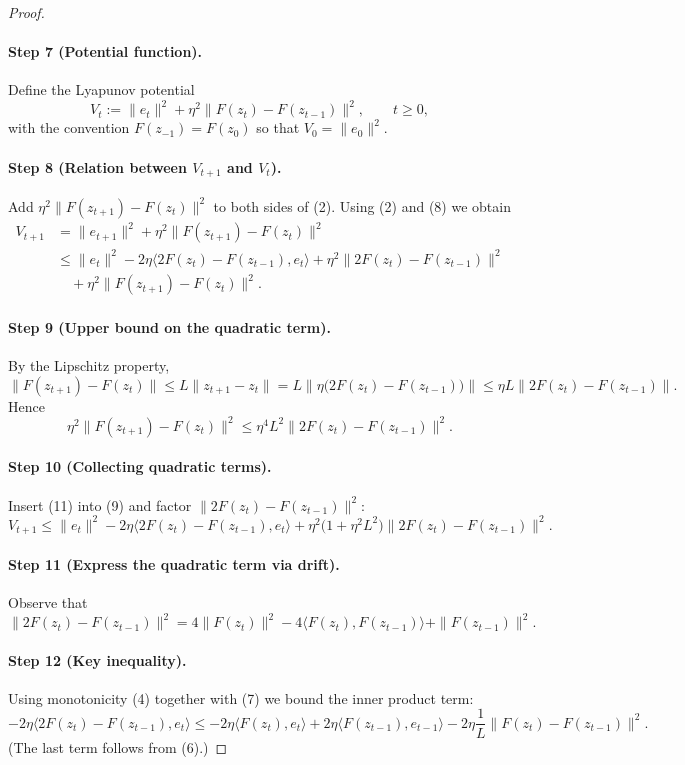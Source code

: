 \documentclass{article}
\begin{document}
\begin{proof}
\paragraph{Step 7 (Potential function).}
Define the Lyapunov potential
\[
V_t:=\|e_t\|^2+\eta^2\|F(z_t)-F(z_{t-1})\|^2,\qquad t\ge0,
\tag{8}
\]
with the convention $F(z_{-1})=F(z_0)$ so that $V_0=\|e_0\|^2$.

\paragraph{Step 8 (Relation between $V_{t+1}$ and $V_t$).}
Add $\eta^2\|F(z_{t+1})-F(z_t)\|^2$ to both sides of (2). Using (2) and (8) we obtain
\[
\begin{aligned}
V_{t+1}
&= \|e_{t+1}\|^2+\eta^2\|F(z_{t+1})-F(z_t)\|^2\\
&\le \|e_t\|^2
-2\eta\bigl\langle 2F(z_t)-F(z_{t-1}),e_t\bigr\rangle
+\eta^2\|2F(z_t)-F(z_{t-1})\|^2\\
&\quad+\eta^2\|F(z_{t+1})-F(z_t)\|^2 .
\end{aligned}
\tag{9}
\]

\paragraph{Step 9 (Upper bound on the quadratic term).}
By the Lipschitz property,
\[
\|F(z_{t+1})-F(z_t)\|\le L\|z_{t+1}-z_t\|
= L\bigl\|\eta\bigl(2F(z_t)-F(z_{t-1})\bigr)\bigr\|
\le \eta L\bigl\|2F(z_t)-F(z_{t-1})\bigr\|.
\tag{10}
\]
Hence
\[
\eta^2\|F(z_{t+1})-F(z_t)\|^2\le \eta^4L^2\|2F(z_t)-F(z_{t-1})\|^2 .
\tag{11}
\]

\paragraph{Step 10 (Collecting quadratic terms).}
Insert (11) into (9) and factor $\|2F(z_t)-F(z_{t-1})\|^2$:
\[
V_{t+1}\le \|e_t\|^2
-2\eta\bigl\langle 2F(z_t)-F(z_{t-1}),e_t\bigr\rangle
+\eta^2\bigl(1+\eta^2L^2\bigr)\|2F(z_t)-F(z_{t-1})\|^2 .
\tag{12}
\]

\paragraph{Step 11 (Express the quadratic term via drift).}
Observe that
\[
\|2F(z_t)-F(z_{t-1})\|^2
=4\|F(z_t)\|^2-4\langle F(z_t),F(z_{t-1})\rangle+\|F(z_{t-1})\|^2 .
\tag{13}
\]

\paragraph{Step 12 (Key inequality).}
Using monotonicity (4) together with (7) we bound the inner product term:
\[
-2\eta\bigl\langle 2F(z_t)-F(z_{t-1}),e_t\bigr\rangle
\le -2\eta\bigl\langle F(z_t),e_t\bigr\rangle
+2\eta\bigl\langle F(z_{t-1}),e_{t-1}\bigr\rangle
-2\eta\frac{1}{L}\|F(z_t)-F(z_{t-1})\|^2 .
\tag{14}
\]
(The last term follows from (6).)


\end{proof}
\end{document}

